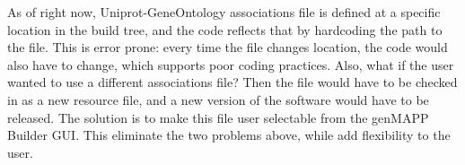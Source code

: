 As of right now, Uniprot-GeneOntology associations file is defined at a specific location in the build tree,
and the code reflects that by hardcoding the path to the file. This is error prone: every time the file changes location,
the code would also have to change, which supports poor coding practices. Also, what if the user wanted to use a different
associations file? Then the file would have to be checked in as a new resource file, and a new version of the software would have
to be released. The solution is to make this file user selectable from the genMAPP Builder GUI. This eliminate the two problems
above, while add flexibility to the user.
